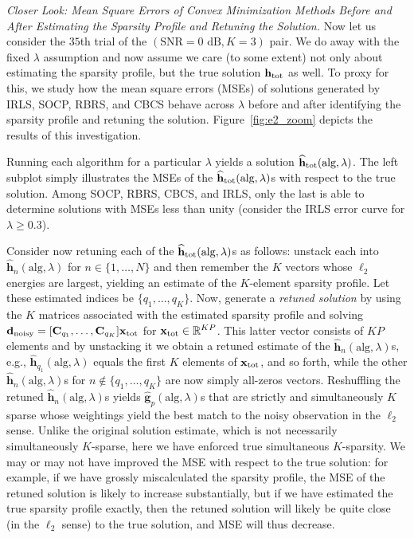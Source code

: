 \documentclass[final]{siamltex}
\newcommand{\field}[1]{\mathbb{#1}}
\newcommand{\la}[1]{\mbox{$\mathbf{#1}$}}  \newcommand{\sst}[1]{\mbox{\scriptsize{#1}}}
\begin{document}
   {\em{Closer Look: Mean Square Errors of Convex Minimization Methods
   Before and After Estimating the Sparsity Profile and Retuning the
   Solution}.}  Now let us consider the $35$th trial of the
   $(\mbox{SNR} = 0 \mbox{ dB}, K = 3)$ pair.  We do away with the
   fixed $\lambda$ assumption and now assume we care (to some extent)
   not only about estimating the sparsity profile, but the true
   solution $\la{h}_{\sst{tot}}$ as well.  To proxy for this, we study
   how the mean square errors (MSEs) of solutions generated by IRLS,
   SOCP, RBRS, and CBCS behave across $\lambda$ before and after
   identifying the sparsity profile and retuning the solution.
   Figure~\ref{fig:e2_zoom} depicts the results of this investigation.

   Running each algorithm for a particular $\lambda$ yields a solution
   $\widehat{\la{h}}_{\sst{tot}}(\mbox{alg},\lambda)$.  The left
   subplot simply illustrates the MSEs of the
   $\widehat{\la{h}}_{\sst{tot}}(\mbox{alg},\lambda)$s with respect
   to the true solution. Among SOCP, RBRS, CBCS, and IRLS, only the
   last is able to determine solutions with MSEs less than unity
   (consider the IRLS error curve for $\lambda \geq 0.3$).

   Consider now retuning each of the
   $\widehat{\la{h}}_{\sst{tot}}(\mbox{alg}, \lambda)$s as follows:
   unstack each into $\widehat{\la{h}}_n(\mbox{alg},\lambda)$ for $n
   \in \{1, \ldots, N\}$ and then remember the $K$ vectors whose
   $\ell_2$ energies are largest, yielding an estimate of the
   $K$-element sparsity profile.  Let these estimated indices be
   $\{q_1, \ldots, q_K\}$.  Now, generate a {\em{retuned solution}} by
   using the $K$ matrices associated with the estimated sparsity
   profile and solving $\la{d}_{\sst{noisy}} = [\la{C}_{q_1}, \ldots,
   \la{C}_{q_K} ] \la{x}_{\sst{tot}}$ for $\la{x}_{\sst{tot}} \in
   \field{R}^{KP}$.  This latter vector consists of $KP$ elements and
   by unstacking it we obtain a retuned estimate of the
   $\widehat{\la{h}}_n(\mbox{alg},\lambda)$s, e.g.,
   $\widehat{\la{h}}_{q_1}(\mbox{alg},\lambda)$ equals the first $K$
   elements of $\la{x}_{\sst{tot}}$, and so forth, while the other
   $\widehat{\la{h}}_n(\mbox{alg},\lambda)$s for $n \notin \{q_1,
   \ldots, q_K\}$ are now simply all-zeros vectors.  Reshuffling the
   retuned $\widehat{\la{h}}_n(\mbox{alg},\lambda)$s yields
   $\widehat{\la{g}}_p(\mbox{alg},\lambda)$s that are strictly and
   simultaneously $K$ sparse whose weightings yield the best match to
   the noisy observation in the $\ell_2$ sense.  Unlike the original
   solution estimate, which is not necessarily simultaneously
   $K$-sparse, here we have enforced true simultaneous $K$-sparsity.
   We may or may not have improved the MSE with respect to the true
   solution: for example, if we have grossly miscalculated the
   sparsity profile, the MSE of the retuned solution is likely to
   increase substantially, but if we have estimated the true sparsity
   profile exactly, then the retuned solution will likely be quite
   close (in the $\ell_2$ sense) to the true solution, and MSE will
   thus decrease.
   
\end{document}
